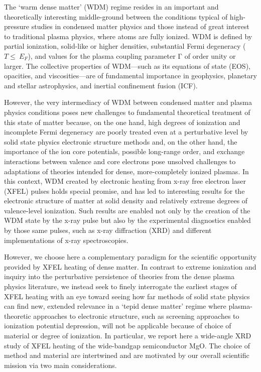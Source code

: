 The `warm dense matter' (WDM) regime resides in an important and
theoretically interesting middle-ground between the conditions typical
of high-pressure studies in condensed matter physics and those instead
of great interest to traditional plasma physics, where atoms are fully
ionized. WDM is defined by partial ionization, solid-like or higher
densities, substantial Fermi degeneracy (\(T \leq \ E_{F}\)), and values
for the plasma coupling parameter Γ of order unity or larger. \cite{koenig2005progress}
The collective properties of WDM---such as its equations of state (EOS),
opacities, and viscosities---are of fundamental importance in
geophysics, planetary and stellar astrophysics, and inertial confinement
fusion (ICF). \cite{atzeni2004physics}

However, the very intermediacy of WDM between condensed matter and
plasma physics conditions poses new challenges to fundamental
theoretical treatment of this state of matter because, on the one hand,
high degrees of ionization and incomplete Fermi degeneracy are poorly
treated even at a perturbative level by solid state physics electronic
structure methods and, on the other hand, the importance of the ion core
potentials, possible long-range order, and exchange interactions between
valence and core electrons pose unsolved challenges to adaptations of
theories intended for dense, more-completely ionized plasmas. In this
context, WDM created by electronic heating from x-ray free electron
laser (XFEL) pulses holds special promise, and has led to interesting
results for the electronic structure of matter at solid density and
relatively extreme degrees of valence-level ionization. \cite{rackstraw2015saturable, ciricosta2016measurements} Such
results are enabled not only by the creation of the WDM state by the
x-ray pulse but also by the experimental diagnostics enabled by those
same pulses, such as x-ray diffraction (XRD) and different
implementations of x-ray spectroscopies. \cite{chase2016ultrafast, yano2009x, mcneil2010x, chapman2011femtosecond}

However, we choose here a complementary paradigm for the scientific
opportunity provided by XFEL heating of dense matter. In contrast to
extreme ionization and inquiry into the perturbative persistence of
theories from the dense plasma physics literature, we instead seek to
finely interrogate the earliest stages of XFEL heating with an eye
toward seeing how far methods of solid state physics can find new,
extended relevance in a `tepid dense matter' regime where
plasma-theoretic approaches to electronic structure, such as screening
approaches to ionization potential depression, will not be applicable
because of choice of material or degree of ionization. In particular, we
report here a wide-angle XRD study of XFEL heating of the wide-bandgap
semiconductor MgO. The choice of method and material are intertwined and
are motivated by our overall scientific mission via two main
considerations.

